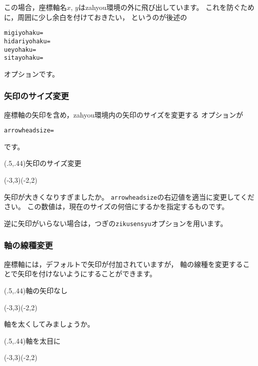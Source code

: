 この場合，座標軸名$x$, $y$は\textsf{zahyou}環境の外に飛び出しています。
これを防ぐために，周囲に少し余白を付けておきたい，
というのが後述の
\begin{jquote}
\begin{verbatim}
migiyohaku=
hidariyohaku=
ueyohaku=
sitayohaku=
\end{verbatim}
\end{jquote}
オプションです。

\subsubsection{矢印のサイズ変更}
座標軸の矢印を含め，\textsf{zahyou}環境内の矢印のサイズを変更する
オプションが
\begin{jquote}
\begin{verbatim}
arrowheadsize=
\end{verbatim}
\end{jquote}
です。

\begin{showEx}(.5,.44){矢印のサイズ変更}
\begin{zahyou}%
  [%
    ul=8mm,
    arrowheadsize=2.5
  ]%
  (-3,3)(-2,2)%
\end{zahyou}%
\end{showEx}

矢印が大きくなりすぎましたか。
\verb+arrowheadsize+の右辺値を適当に変更してください。
この数値は，現在のサイズの何倍にするかを指定するものです。

逆に矢印がいらない場合は，つぎの\verb/zikusensyu/オプションを用います。

\subsubsection{軸の線種変更}
座標軸には，デフォルトで矢印が付加されていますが，
軸の線種を変更することで矢印を付けないようにすることができます。

\begin{showEx}(.5,.44){軸の矢印なし}
\begin{zahyou}%
  [%
    ul=8mm,
    zikusensyu=\drawline
  ]%
  (-3,3)(-2,2)%
\end{zahyou}%
\end{showEx}

軸を太くしてみましょうか。

\begin{showEx}(.5,.44){軸を太目に}
\begin{zahyou}%
  [%
    ul=8mm,
    zikusensyu=\thicklines\drawline
  ]%
  (-3,3)(-2,2)%
\end{zahyou}%
\end{showEx}


